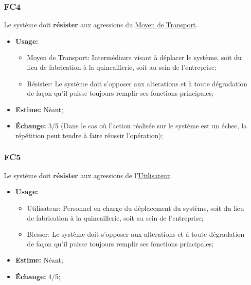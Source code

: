 \documentclass{article}
\begin{document}
\subsubsection{FC4}\label{cat:fc4}
Le système doit \textbf{résister} aux agressions du \uline{Moyen de Transport}.
\begin{itemize}
	\item \textbf{Usage:} \begin{itemize}
		\item Moyen de Transport: Intermédiaire visant à déplacer le système,
			  soit du lieu de fabrication à la quincaillerie, soit au sein de
			  l'entreprise;
		\item Résister: Le système doit s'opposer aux alterations et à toute
			  dégradation de façon qu'il puisse toujours remplir ses fonctions
			  principales;
	\end{itemize}
	\item \textbf{Estime:} Néant;
	\item \textbf{Échange:} 3/5 (Dans le cas où l'action réalisée sur le
		  système est un échec, la répétition peut tendre à faire réussir
		  l'opération);
\end{itemize}

\subsubsection{FC5}\label{cat:fc5}
Le système doit \textbf{résister} aux agressions de l'\uline{Utilisateur}.
\begin{itemize}
	\item \textbf{Usage:} \begin{itemize}
		\item Utilisateur: Personnel en charge du déplacement du système, soit
			  du lieu de fabrication à la quincaillerie, soit au sein de
			  l'entreprise;
		\item Blesser: Le système doit s'opposer aux alterations et à toute
			  dégradation de façon qu'il puisse toujours remplir ses fonctions
			  principales;
	\end{itemize}
	\item \textbf{Estime:} Néant;
	\item \textbf{Échange:} 4/5;
\end{itemize}
\end{document}
